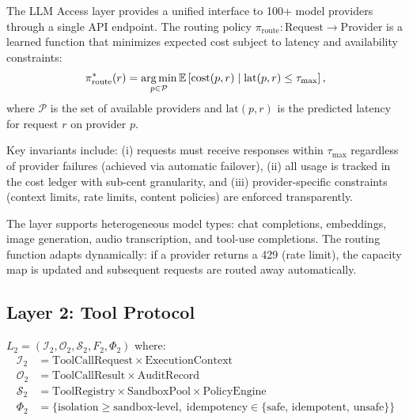 The LLM Access layer provides a unified interface to 100+ model providers
through a single API endpoint. The routing policy $\pi_{\text{route}} :
\text{Request} \to \text{Provider}$ is a learned function that minimizes
expected cost subject to latency and availability constraints:
\begin{equation}
    \pi_{\text{route}}^*(r) = \operatorname*{arg\,min}_{p \in \mathcal{P}}
        \mathbb{E}\left[\text{cost}(p, r) \mid \text{lat}(p, r) \leq \tau_{\max}\right],
\end{equation}
where $\mathcal{P}$ is the set of available providers and $\text{lat}(p, r)$
is the predicted latency for request $r$ on provider $p$.

Key invariants include: (i) requests must receive responses within
$\tau_{\max}$ regardless of provider failures (achieved via automatic failover),
(ii) all usage is tracked in the cost ledger with sub-cent granularity, and
(iii) provider-specific constraints (context limits, rate limits, content
policies) are enforced transparently.

The layer supports heterogeneous model types: chat completions, embeddings,
image generation, audio transcription, and tool-use completions. The routing
function adapts dynamically: if a provider returns a 429 (rate limit), the
capacity map is updated and subsequent requests are routed away automatically.

\subsection{Layer 2: Tool Protocol}

\begin{definition}
    $L_2 = \left(\mathcal{I}_2, \mathcal{O}_2, \mathcal{S}_2, F_2, \Phi_2\right)$ where:
    \begin{align*}
        \mathcal{I}_2 &= \text{ToolCallRequest} \times \text{ExecutionContext} \\
        \mathcal{O}_2 &= \text{ToolCallResult} \times \text{AuditRecord} \\
        \mathcal{S}_2 &= \text{ToolRegistry} \times \text{SandboxPool} \times
                         \text{PolicyEngine} \\
        \Phi_2 &= \{\text{isolation} \geq \text{sandbox-level},\;
                    \text{idempotency} \in \{\text{safe, idempotent, unsafe}\}\}
    \end{align*}
\end{definition}

